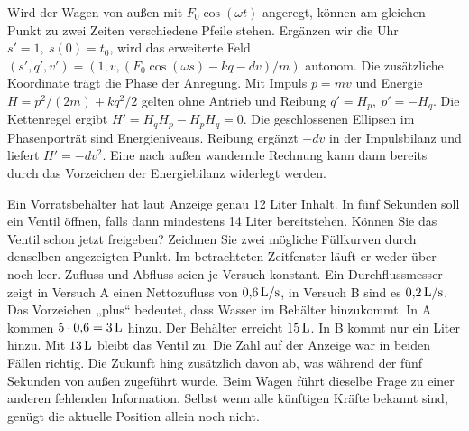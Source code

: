 \hypertarget{punkt1-1-2}{}
Wird der Wagen von außen mit \(F_0\cos(\omega t)\) angeregt, können am gleichen Punkt zu zwei Zeiten verschiedene Pfeile stehen. Ergänzen wir die Uhr \(s'=1,\ s(0)=t_0\), wird das erweiterte Feld \((s',q',v')=(1,v,(F_0\cos(\omega s)-kq-dv)/m)\) autonom. Die zusätzliche Koordinate trägt die Phase der Anregung.
\hypertarget{punkt1-1-3}{}
Mit Impuls \(p=mv\) und Energie \(H=p^2/(2m)+kq^2/2\) gelten ohne Antrieb und Reibung \(q'=H_p,\ p'=-H_q\). Die Kettenregel ergibt \(H'=H_qH_p-H_pH_q=0\). Die geschlossenen Ellipsen im Phasenporträt sind Energieniveaus. Reibung ergänzt \(-dv\) in der Impulsbilanz und liefert \(H'=-dv^2\). Eine nach außen wandernde Rechnung kann dann bereits durch das Vorzeichen der Energiebilanz widerlegt werden.


Ein Vorratsbehälter hat laut Anzeige genau 12 Liter Inhalt. In fünf Sekunden soll ein Ventil öffnen, falls dann mindestens 14 Liter bereitstehen. Können Sie das Ventil schon jetzt freigeben? Zeichnen Sie zwei mögliche Füllkurven durch denselben angezeigten Punkt.
Im betrachteten Zeitfenster läuft er weder über noch leer. Zufluss und Abfluss seien je Versuch konstant. Ein Durchflussmesser zeigt in Versuch A einen Nettozufluss von \(0{,}6\,\mathrm{L/s}\), in Versuch B sind es \(0{,}2\,\mathrm{L/s}\). Das Vorzeichen „plus“ bedeutet, dass Wasser im Behälter hinzukommt.
In A kommen \(5\cdot0{,}6=3\,\mathrm{L}\) hinzu. Der Behälter erreicht \(15\,\mathrm{L}\). In B kommt nur ein Liter hinzu. Mit \(13\,\mathrm{L}\) bleibt das Ventil zu. Die Zahl auf der Anzeige war in beiden Fällen richtig. Die Zukunft hing zusätzlich davon ab, was während der fünf Sekunden von außen zugeführt wurde.
Beim Wagen führt dieselbe Frage zu einer anderen fehlenden Information. Selbst wenn alle künftigen Kräfte bekannt sind, genügt die aktuelle Position allein noch nicht.

